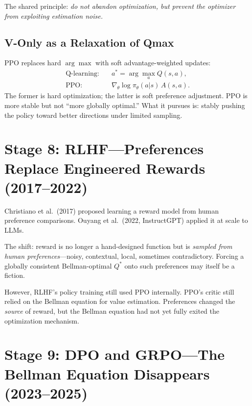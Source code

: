 The shared principle: \emph{do not abandon optimization, but prevent the optimizer from exploiting estimation noise.}

\subsection{V-Only as a Relaxation of Qmax}

PPO replaces hard $\arg\max$ with soft advantage-weighted updates:
\begin{align}
\text{Q-learning:} \quad & a^{\ast} = \arg\max_a Q(s,a), \\
\text{PPO:} \quad & \nabla_\theta \log \pi_\theta(a|s)\, A(s,a).
\end{align}
The former is hard optimization; the latter is soft preference adjustment.
PPO is more stable but not ``more globally optimal.''
What it pursues is: stably pushing the policy toward better directions under limited sampling.

\section{Stage 8: RLHF---Preferences Replace Engineered Rewards (2017--2022)}
\label{sec:stage8-rlhf}

Christiano et al.\ (2017) proposed learning a reward model from human preference comparisons.
Ouyang et al.\ (2022, InstructGPT) applied it at scale to LLMs.

The shift: reward is no longer a hand-designed function but is \emph{sampled from human preferences}---noisy, contextual, local, sometimes contradictory.
Forcing a globally consistent Bellman-optimal $Q^{\ast}$ onto such preferences may itself be a fiction.

However, RLHF's policy training still used PPO internally.
PPO's critic still relied on the Bellman equation for value estimation.
Preferences changed the \emph{source} of reward, but the Bellman equation had not yet fully exited the optimization mechanism.

\section{Stage 9: DPO and GRPO---The Bellman Equation Disappears (2023--2025)}
\label{sec:stage9-dpo}

